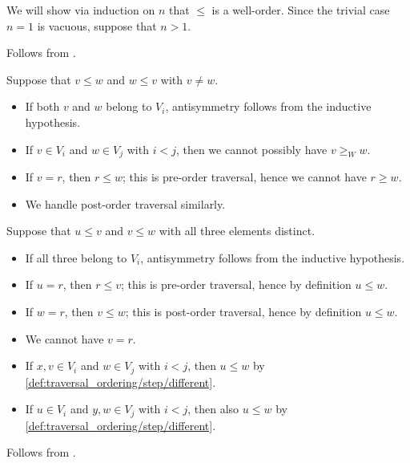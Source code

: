 \begin{defproof}
  We will show via induction on \( n \) that \( \leq \) is a well-order. Since the trivial case \( n = 1 \) is vacuous, suppose that \( n > 1 \).

   Follows from .

   Suppose that \( v \leq w \) and \( w \leq v \) with \( v \neq w \).
  \begin{itemize}
    \item If both \( v \) and \( w \) belong to \( V_i \), antisymmetry follows from the inductive hypothesis.
    \item If \( v \in V_i \) and \( w \in V_j \) with \( i < j \), then we cannot possibly have \( v \geq_W w \).
    \item If \( v = r \), then \( r \leq w \); this is pre-order traversal, hence we cannot have \( r \geq w \).
    \item We handle post-order traversal similarly.
  \end{itemize}

   Suppose that \( u \leq v \) and \( v \leq w \) with all three elements distinct.
  \begin{itemize}
    \item If all three belong to \( V_i \), antisymmetry follows from the inductive hypothesis.
    \item If \( u = r \), then \( r \leq v \); this is pre-order traversal, hence by definition \( u \leq w \).
    \item If \( w = r \), then \( v \leq w \); this is post-order traversal, hence by definition \( u \leq w \).
    \item We cannot have \( v = r \).
    \item If \( x, v \in V_i \) and \( w \in V_j \) with \( i < j \), then \( u \leq w \) by \ref{def:traversal_ordering/step/different}.
    \item If \( u \in V_i \) and \( y, w \in V_j \) with \( i < j \), then also \( u \leq w \) by \ref{def:traversal_ordering/step/different}.
  \end{itemize}

   Follows from .
\end{defproof}
